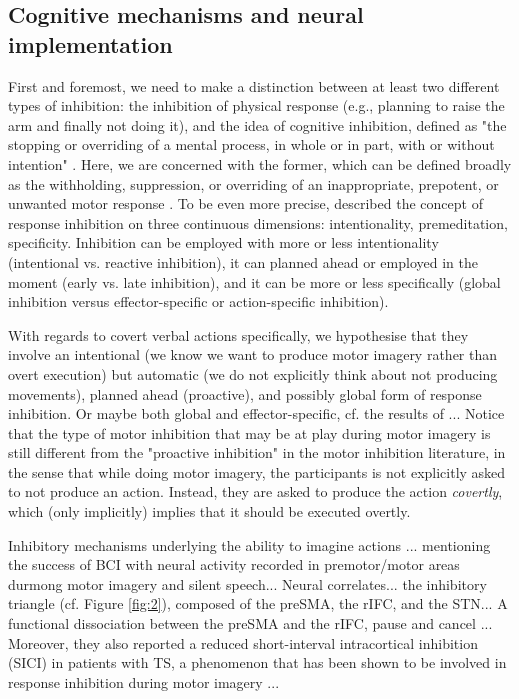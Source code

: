 \documentclass[utf8]{template/frontiersSCNS} %
\begin{document}
\subsection{Cognitive mechanisms and neural implementation}

First and foremost, we need to make a distinction between at least two different types of inhibition: the inhibition of physical response (e.g., planning to raise the arm and finally not doing it), and the idea of cognitive inhibition, defined as "the stopping or overriding of a mental process, in whole or in part, with or without intention" \citep{gorfein_concept_2007}. Here, we are concerned with the former, which can be defined broadly as the withholding, suppression, or overriding of an inappropriate, prepotent, or unwanted motor response \citep{aron_neural_2007, oshea_go_2018}. To be even more precise, \cite{ridderinkhof_dont_2014} described the concept of response inhibition on three continuous dimensions: intentionality, premeditation, specificity. Inhibition can be employed with more or less intentionality (intentional vs. reactive inhibition), it can planned ahead or employed in the moment (early vs. late inhibition), and it can be more or less specifically (global inhibition versus effector-specific or action-specific inhibition).

With regards to covert verbal actions specifically, we hypothesise that they involve an intentional (we know we want to produce motor imagery rather than overt execution) but automatic (we do not explicitly think about not producing movements), planned ahead (proactive), and possibly global form of response inhibition. Or maybe both global and effector-specific, cf. the results of \cite{rieger_inhibition_2017}... Notice that the type of motor inhibition that may be at play during motor imagery is still different from the "proactive inhibition" in the motor inhibition literature, in the sense that while doing motor imagery, the participants is not explicitly asked to not produce an action. Instead, they are asked to produce the action \textit{covertly}, which (only implicitly) implies that it should be executed overtly.

Inhibitory mechanisms underlying the ability to imagine actions \citep{guillot_imagining_2012, schwoebel_man_2002}... mentioning the success of BCI with neural activity recorded in premotor/motor areas durmong motor imagery and silent speech... Neural correlates... the inhibitory triangle (cf. Figure \ref{fig:2}), composed of the preSMA, the rIFC, and the STN... A functional dissociation between the preSMA and the rIFC, pause and cancel \citep{diesburg_pause-then-cancel_2021}... Moreover, they also reported a reduced short-interval intracortical inhibition (SICI) in patients with TS, a phenomenon that has been shown to be involved in response inhibition during motor imagery \citep{neige_unravelling_2020}...
\end{document}
